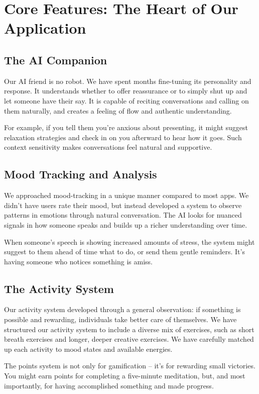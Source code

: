 \documentclass[12pt]{article}
\begin{document}
\section{Core Features: The Heart of Our Application}

\subsection{The AI Companion}
Our AI friend is no robot. We have spent months fine-tuning its personality and response. It understands whether to offer reassurance or to simply shut up and let someone have their say. It is capable of reciting conversations and calling on them naturally, and creates a feeling of flow and authentic understanding.

For example, if you tell them you're anxious about presenting, it might suggest relaxation strategies and check in on you afterward to hear how it goes. Such context sensitivity makes conversations feel natural and supportive.

\subsection{Mood Tracking and Analysis}
We approached mood-tracking in a unique manner compared to most apps. We didn't have users rate their mood, but instead developed a system to observe patterns in emotions through natural conversation. The AI looks for nuanced signals in how someone speaks and builds up a richer understanding over time.

When someone's speech is showing increased amounts of stress, the system might suggest to them ahead of time what to do, or send them gentle reminders. It's having someone who notices something is amiss.

\subsection{The Activity System}
Our activity system developed through a general observation: if something is possible and rewarding, individuals take better care of themselves. We have structured our activity system to include a diverse mix of exercises, such as short breath exercises and longer, deeper creative exercises. We have carefully matched up each activity to mood states and available energies.

The points system is not only for gamification – it's for rewarding small victories. You might earn points for completing a five-minute meditation, but, and most importantly, for having accomplished something and made progress.
\end{document}
